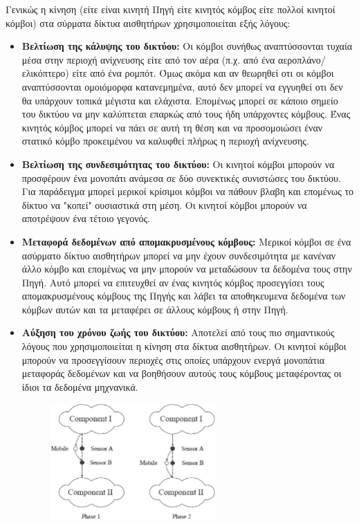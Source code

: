 Γενικώς η κίνηση (είτε είναι κινητή Πηγή είτε κινητός κόμβος είτε πολλοί κινητοί κόμβοι) στα σύρματα δίκτυα αισθητήρων χρησιμοποιείται εξής λόγους:

\begin{itemize}
\item \textbf{Βελτίωση της κάλυψης του δικτύου:} Οι κόμβοι συνήθως αναπτύσσονται τυχαία μέσα στην περιοχή ανίχνευσης είτε από τον αέρα (π.χ. από ένα
αεροπλάνο/ελικόπτερο) είτε από ένα ρομπότ. Όμως ακόμα και αν θεωρηθεί οτι οι κόμβοι αναπτύσσονται ομοιόμορφα κατανεμημένα, αυτό δεν μπορεί να εγγυηθεί οτι δεν θα
υπάρχουν τοπικά μέγιστα και ελάχιστα. Επομένως μπορεί σε κάποιο σημείο του δικτύου να μην καλύπτεται επαρκώς από τους ήδη υπάρχοντες κόμβους. Ένας κινητός κόμβος
μπορεί να πάει σε αυτή τη θέση και να προσομοιώσει έναν στατικό κόμβο προκειμένου να καλυφθεί πλήρως η περιοχή ανίχνευσης.
\item \textbf{Βελτίωση της συνδεσιμότητας του δικτύου:} Οι κινητοί κόμβοι μπορούν να προσφέρουν ένα μονοπάτι ανάμεσα σε δύο συνεκτικές συνιστώσες του δικτύου. Για
παράδειγμα μπορεί μερικοί κρίσιμοι κόμβοι να πάθουν βλαβη και επομένως το δίκτυο να "κοπεί" ουσιαστικά στη μέση. Οι κινητοί κόμβοι μπορούν να αποτρέψουν ένα τέτοιο
γεγονός.
\item \textbf{Μεταφορά δεδομένων από απομακρυσμένους κόμβους:} Μερικοί κόμβοι σε ένα ασύρματο δίκτυο αισθητήρων μπορεί να μην έχουν συνδεσιμότητα με κανέναν άλλο
κόμβο και επομένως να μην μπορούν να μεταδώσουν τα δεδομένα τους στην Πηγή. Αυτό μπορεί να επιτευχθεί αν ένας κινητός κόμβος προσεγγίσει τους απομακρυσμένους κόμβους
της Πηγής και λάβει τα αποθηκευμενα δεδομένα των κόμβων αυτών και τα μεταφέρει σε άλλους κόμβους ή στην Πηγή.
\item \textbf{Αύξηση του χρόνου ζωής του δικτύου:} Αποτελεί από τους πιο σημαντικούς λόγους που χρησιμοποιείται η κίνηση στα δίκτυα αισθητήρων. Οι κινητοί κόμβοι
μπορούν να προσεγγίσουν περιοχές στις οποίες υπάρχουν ενεργά μονοπάτια μεταφοράς δεδομένων και να βοηθήσουν αυτούς τους κόμβους μεταφέροντας οι ίδιοι τα δεδομένα
μηχνανικά.
\begin{figure}[h]
	\centering
	\includegraphics[width=0.6\textwidth]{images/mobile_help.eps}

\end{figure}
\end{itemize}
